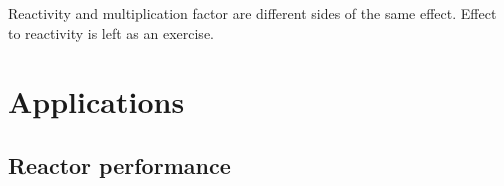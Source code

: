 Reactivity and multiplication factor are different sides of the same effect. Effect to reactivity is left as an exercise.

















\section{Applications}
\label{sect:applications}


\subsection{Reactor performance}

